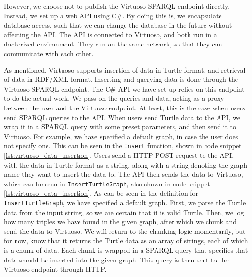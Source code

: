 However, we choose not to publish the Virtuoso SPARQL endpoint directly. Instead, we set up a web API using C\#.
By doing this is, we encapsulate database access, such that we can change the database in the future without affecting the API.
The API is connected to Virtuoso, and both run in a dockerized environment. They run on the same network, so that they can communicate with each other.

As mentioned, Virtuoso supports insertion of data in Turtle format, and retrieval of data in RDF/XML format. Inserting and querying data is done through the Virtuoso SPARQL endpoint. The C\# API we have set up relies on this endpoint to do the actual work. We pass on the queries and data, acting as a proxy between the user and the Virtuoso endpoint. At least, this is the case when users send SPARQL queries to the API. When users send Turtle data to the API, we wrap it in a SPARQL query with some preset parameters, and then send it to Virtuoso. For example, we have specified a default graph, in case the user does not specify one.
This can be seen in the \texttt{Insert} function, shown in code snippet \ref{lst:virtuoso_data_insertion}. Users send a HTTP POST request to the API, with the data in Turtle format as a string, along with a string denoting the graph name they want to insert the data to. The API then sends the data to Virtuoso, which can be seen in \texttt{InsertTurtleGraph}, also shown in code snippet \ref{lst:virtuoso_data_insertion}. As can be seen in the definition for \texttt{InsertTurtleGraph}, we have specified a default graph. First, we parse the Turtle data from the input string, so we are certain that it is valid Turtle. Then, we log how many triples we have found in the given graph, after which we chunk and send the data to Virtuoso. We will return to the chunking logic momentarily, but for now, know that it returns the Turtle data as an array of strings, each of which is a chunk of data. Each chunk is wrapped in a SPARQL query that specifies that data should be inserted into the given graph. This query is then sent to the Virtuoso endpoint through HTTP.


